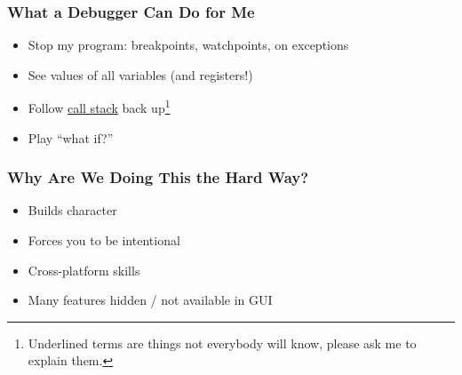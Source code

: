 \documentclass[aspectratio=169]{beamer}
\begin{document}
\begin{frame}
    \frametitle{What a Debugger Can Do for Me}

    \begin{itemize}
        \item Stop my program: breakpoints, watchpoints, on exceptions
        \item See values of all variables (and registers!)
        \item Follow \underline{call stack} back up\footnote[frame]{Underlined terms are things not everybody will know, please ask me to explain them.}
        \item Play ``what if?''
    \end{itemize}

\end{frame}
\begin{frame}
    \frametitle{Why Are We Doing This the Hard Way?}
    \begin{itemize}
        \item Builds character
        \pause
        \item Forces you to be intentional
        \item Cross-platform skills
        \item Many features hidden / not available in GUI
    \end{itemize}
    

\end{frame}
\end{document}
